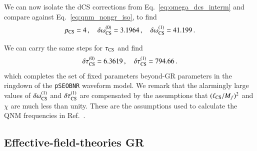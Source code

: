 \documentclass[twocolumn,
               prd,
               aps,
               superscriptaddress,
               tightenlines,
               nofootinbib,
               eqsecnum,
               amsfonts,
               amsmath,
               longbibliography]{revtex4-1}
\newcommand{\pSEOB}{\texttt{pSEOBNR}}
\begin{document}
We can now isolate the dCS corrections from Eq.~\eqref{eq:omega_dcs_interm} and
compare against Eq.~\eqref{eq:qnm_nongr_iso}, to find
%
\begin{equation}
p_{\rm CS} = 4\,, \quad \delta \omega^{(0)}_{\rm CS} = 3.1964\,, \quad \delta \omega^{(1)}_{\rm CS} = 41.199\,.
\label{eq:cs_omega_coefs}
\end{equation}

We can carry the same steps for $\tau_{\rm CS}$ and find
%
\begin{equation}
\delta \tau^{(0)}_{\rm CS} = 6.3619\,, \quad \delta \tau^{(1)}_{\rm CS} = 794.66\,.
\label{eq:cs_tau_coefs}
\end{equation}
%
which completes the set of fixed parameters beyond-GR parameters in the ringdown of the \pSEOB{} waveform model.
%
We remark that the alarmingly large values of $\delta \omega_{\rm CS}^{(1)}$ and $\delta \tau_{\rm CS}^{(1)}$
are compensated by the assumptions that $(\ell_{\rm CS} / M_f)^2$ and $\chi$ are much less than unity. These
are the assumptions used to calculate the QNM frequencies in Ref.~\cite{Wagle:2021tam}.

\subsection{Effective-field-theories GR}
\label{app:map_eftofgr}


% 

\end{document}
